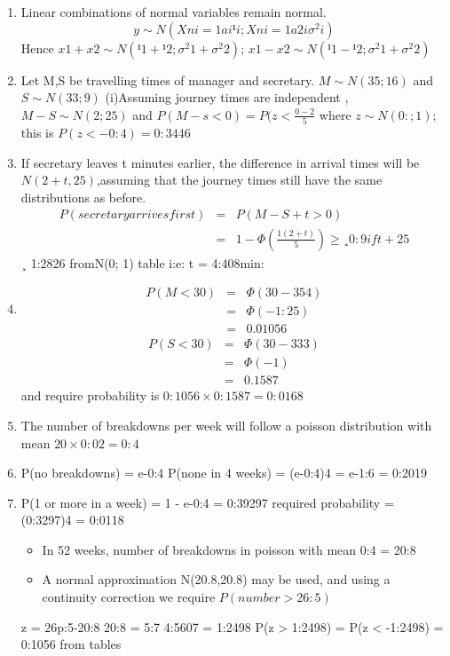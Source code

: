 \documentclass[a4paper,12pt]{article}
\begin{document}
\begin{enumerate}
    \item 
Linear combinations of normal variables remain normal.
\[
y \sim N(
Xn
i=1
ai¹i;
Xn
i=1
a2
i \sigma^2
i )\]
Hence $x1 + x2 \sim N(¹1 + ¹2; \sigma^2
1 + \sigma^2
2)$; $x1 - x2 \sim N(¹1 - ¹2; \sigma^2
1 + \sigma^2
2)$
\item Let M,S be travelling times of manager and secretary.
$M \sim N(35; 16)$ and $S \sim N(33; 9)$
(i)Assuming journey times are independent ,
$M - S \sim N(2; 25)$ and $P(M - s < 0) = P(z <
\frac{0 - 2}{5}$
where $z \sim N(0:; 1)$; this is $P(z < -0:4) = 0:3446$
\item If secretary leaves t minutes earlier, the difference in arrival times will be $N(2+t,25)$,assuming
that the journey times still have the same distributions as before.
\begin{eqnarray*}
P(secretary arrives first) &=& P(M - S + t > 0)\\
&=& 1 - \Phi (\frac{1(2+t)}{5}) \geq¸ 0:9 if
t + 2
5
\end{eqnarray*}
¸ 1:2826 fromN(0; 1) table i:e: t = 4:408min:
\item
\begin{eqnarray*}
P(M < 30) &=& \Phi( 30-35
4 ) \\ &=& \Phi(-1:25)\\ &=& 0.01056
\end{eqnarray*}
\begin{eqnarray*}
P(S < 30)  &=&  \Phi( 30-33
3 ) \\ &=&  \Phi(-1) \\ &=&  0.1587
\end{eqnarray*}
and require probability is $0:1056 \times 0:1587 = 0:0168$
\item  The number of breakdowns per week will follow a poisson distribution with mean
$20 \times 0:02 = 0:4$
\item 
P(no breakdowns) = e-0:4
P(none in 4 weeks) = (e-0:4)4 = e-1:6 = 0:2019
\item 
P(1 or more in a week) = 1 - e-0:4 = 0:39297
required probability = (0:3297)4 = 0:0118
\begin{itemize}
    \item In 52 weeks, number of breakdowns in poisson with mean 0:4  = 20:8 
    \item A normal
approximation N(20.8,20.8) may be used, and using a continuity correction we
require $P(number > 26:5)$
\end{itemize}

z = 26p:5-20:8
20:8 = 5:7
4:5607 = 1:2498
P(z > 1:2498) = P(z < -1:2498) = 0:1056 from tables
\end{enumerate}
\end{document}
